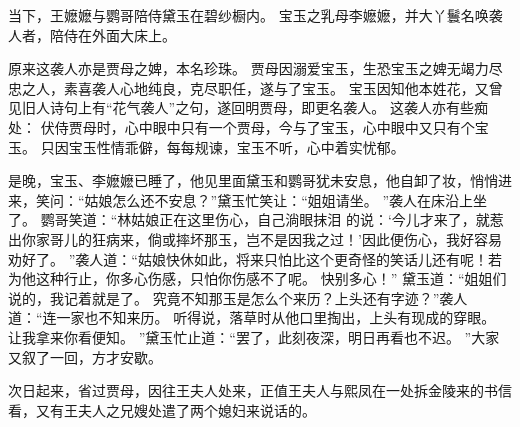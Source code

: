 当下，王嬷嬷与鹦哥陪侍黛玉在碧纱橱内。
宝玉之乳母李嬷嬷，并大丫鬟名唤袭人者，陪侍在外面大床上。
\par
原来这袭人亦是贾母之婢，本名珍珠。
贾母因溺爱宝玉，生恐宝玉之婢无竭力尽忠之人，素喜袭人心地纯良，克尽职任，遂与了宝玉。
宝玉因知他本姓花，又曾见旧人诗句上有“花气袭人”之句，遂回明贾母，即更名袭人。
这袭人亦有些痴处：
伏侍贾母时，心中眼中只有一个贾母，今与了宝玉，心中眼中又只有个宝玉。
只因宝玉性情乖僻，每每规谏，宝玉不听，心中着实忧郁。
\par
是晚，宝玉、李嬷嬷已睡了，他见里面黛玉和鹦哥犹未安息，他自卸了妆，悄悄进来，笑问：“姑娘怎么还不安息？”黛玉忙笑让：“姐姐请坐。
”袭人在床沿上坐了。
鹦哥笑道：“林姑娘正在这里伤心，自己淌眼抹泪
的说：‘今儿才来了，就惹出你家哥儿的狂病来，倘或摔坏那玉，岂不是因我之过！’因此便伤心，我好容易劝好了。
”袭人道：“姑娘快休如此，将来只怕比这个更奇怪的笑话儿还有呢！若为他这种行止，你多心伤感，只怕你伤感不了呢。
快别多心！”
黛玉道：“姐姐们说的，我记着就是了。
究竟不知那玉是怎么个来历？上头还有字迹？”袭人道：“连一家也不知来历。
听得说，落草时从他口里掏出，上头有现成的穿眼。
让我拿来你看便知。
”黛玉忙止道：“罢了，此刻夜深，明日再看也不迟。
”大家又叙了一回，方才安歇。
\par
次日起来，省过贾母，因往王夫人处来，正值王夫人与熙凤在一处拆金陵来的书信看，又有王夫人之兄嫂处遣了两个媳妇来说话的。
